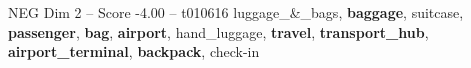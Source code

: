 \begin{textsample}{NEG Dim 2 – Score -4.00 – t010616}  \label{ex:f2_neg_018}
luggage\_\&\_bags, \textbf{baggage}, suitcase, \textbf{passenger}, \textbf{bag}, \textbf{airport}, hand\_luggage, \textbf{travel}, \textbf{transport\_hub}, \textbf{airport\_terminal}, \textbf{backpack}, check-in

\end{textsample}
